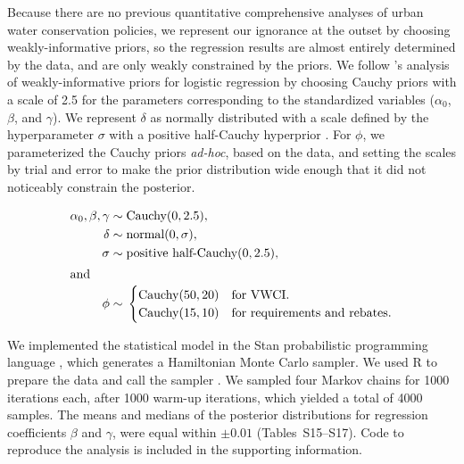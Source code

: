 \documentclass[draft,linenumbers]{agujournal}\usepackage{knitr}
\begin{document}
Because there are no previous quantitative comprehensive analyses of urban
water conservation policies, we represent our ignorance at the outset by
choosing weakly-informative priors, so the regression results are almost
entirely determined by the data, and are only weakly constrained by the priors.
We follow \citet{gelman:prior:2008}'s analysis
of weakly-informative priors for logistic regression
by choosing Cauchy priors with a scale of 2.5 for the
parameters corresponding to the standardized variables ($\alpha_0$, $\beta$,
and $\gamma$).
We represent $\delta$ as normally distributed
with a scale defined by the hyperparameter $\sigma$ with a positive half-Cauchy
hyperprior \citep{gelman:prior:2008}.
For $\phi$, we parameterized the Cauchy priors
\emph{ad-hoc}, based on the data, and setting the scales by trial and error
to make the prior distribution wide enough that it did not noticeably constrain
the posterior.
\begin{linenomath*}
\begin{align}
\alpha_0, \beta, \gamma \sim{} & \text{Cauchy}(0,2.5),\\
\delta \sim{}& \text{normal}(0,\sigma),\\
\sigma \sim{}& \text{positive half-Cauchy}(0,2.5),\\
\intertext{and}
\phi \sim{}& \begin{cases}
\text{Cauchy}(50,20) & \text{for VWCI}. \\
\text{Cauchy}(15,10) & \text{for requirements and rebates}. \\
\end{cases}
\end{align}
\end{linenomath*}

We implemented the statistical model in the Stan probabilistic programming
language \citep{carpenter:stan:2016}, which generates a Hamiltonian Monte Carlo
sampler.
We used R to prepare the data and call the sampler \citep{r.manual:2016}.
We
sampled four Markov chains for 1000 iterations each, after 1000 warm-up iterations,
which yielded a total of 4000 samples.
The means and medians of the posterior distributions for
regression coefficients $\beta$ and $\gamma$, were equal within $\pm 0.01$
(Tables~S15--S17).
Code to reproduce the analysis is included in the supporting information.
\end{document}
